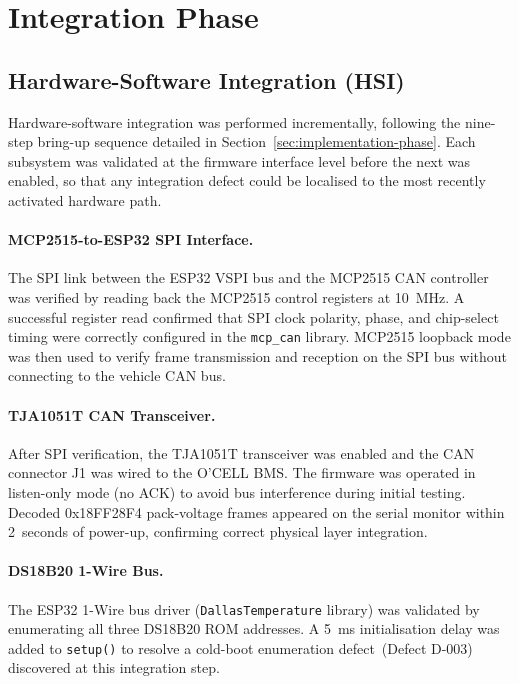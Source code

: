 \section{Integration Phase}

\subsection{Hardware-Software Integration (HSI)}

Hardware-software integration was performed incrementally, following the nine-step bring-up sequence detailed in Section~\ref{sec:implementation-phase}. Each subsystem was validated at the firmware interface level before the next was enabled, so that any integration defect could be localised to the most recently activated hardware path.

\paragraph{MCP2515-to-ESP32 SPI Interface.}
The SPI link between the ESP32 VSPI bus and the MCP2515 CAN controller was verified by reading back the MCP2515 control registers at 10~MHz. A successful register read confirmed that SPI clock polarity, phase, and chip-select timing were correctly configured in the \texttt{mcp\_can} library. MCP2515 loopback mode was then used to verify frame transmission and reception on the SPI bus without connecting to the vehicle CAN bus.

\paragraph{TJA1051T CAN Transceiver.}
After SPI verification, the TJA1051T transceiver was enabled and the CAN connector J1 was wired to the O'CELL BMS. The firmware was operated in listen-only mode (no ACK) to avoid bus interference during initial testing. Decoded 0x18FF28F4 pack-voltage frames appeared on the serial monitor within 2~seconds of power-up, confirming correct physical layer integration.

\paragraph{DS18B20 1-Wire Bus.}
The ESP32 1-Wire bus driver (\texttt{DallasTemperature} library) was validated by enumerating all three DS18B20 ROM addresses. A 5~ms initialisation delay was added to \texttt{setup()} to resolve a cold-boot enumeration defect~(Defect D-003) discovered at this integration step.

